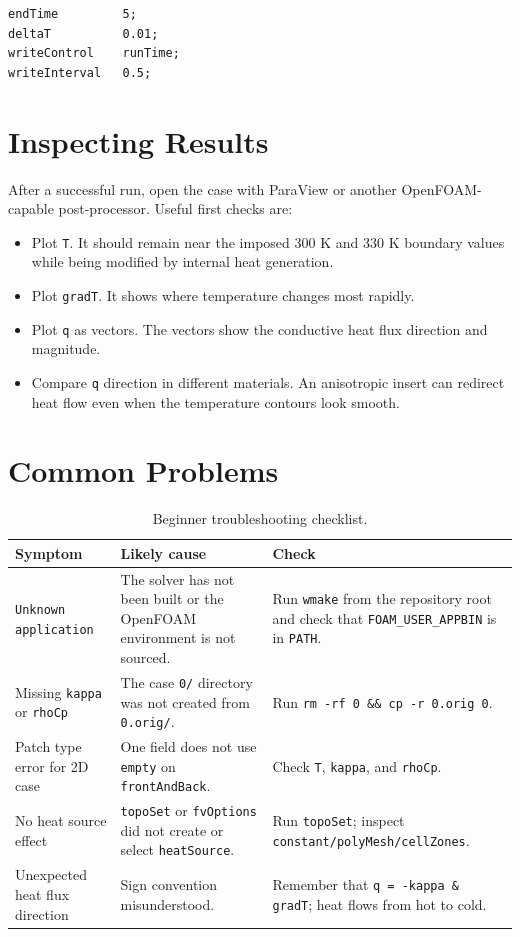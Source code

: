 \documentclass[11pt,a4paper]{article}
\newcommand{\code}[1]{\texttt{#1}}
\begin{document}
\begin{lstlisting}
endTime         5;
deltaT          0.01;
writeControl    runTime;
writeInterval   0.5;
\end{lstlisting}

\section{Inspecting Results}

After a successful run, open the case with ParaView or another OpenFOAM-capable
post-processor. Useful first checks are:

\begin{itemize}
    \item Plot \code{T}. It should remain near the imposed 300 K and 330 K
    boundary values while being modified by internal heat generation.
    \item Plot \code{gradT}. It shows where temperature changes most rapidly.
    \item Plot \code{q} as vectors. The vectors show the conductive heat flux
    direction and magnitude.
    \item Compare \code{q} direction in different materials. An anisotropic
    insert can redirect heat flow even when the temperature contours look
    smooth.
\end{itemize}

\section{Common Problems}

\begin{table}[h]
\centering
\begin{tabularx}{\textwidth}{l Y Y}
\toprule
Symptom & Likely cause & Check \\
\midrule
\code{Unknown application} & The solver has not been built or the OpenFOAM
environment is not sourced. & Run \code{wmake} from the repository root and
check that \code{FOAM\_USER\_APPBIN} is in \code{PATH}. \\
Missing \code{kappa} or \code{rhoCp} & The case \code{0/} directory was not
created from \code{0.orig/}. & Run \code{rm -rf 0 \&\& cp -r 0.orig 0}. \\
Patch type error for 2D case & One field does not use \code{empty} on
\code{frontAndBack}. & Check \code{T}, \code{kappa}, and \code{rhoCp}. \\
No heat source effect & \code{topoSet} or \code{fvOptions} did not create or
select \code{heatSource}. & Run \code{topoSet}; inspect
\texttt{constant/polyMesh/\allowbreak cellZones}. \\
Unexpected heat flux direction & Sign convention misunderstood. &
Remember that \code{q = -kappa \& gradT}; heat flows from hot to cold. \\
\bottomrule
\end{tabularx}
\caption{Beginner troubleshooting checklist.}
\label{tab:troubleshooting}
\end{table}
\end{document}
